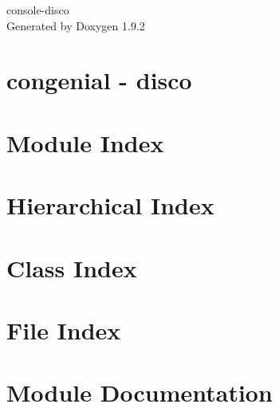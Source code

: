 \documentclass[twoside]{book}
\newcommand{\+}{\discretionary{\mbox{\scriptsize$\hookleftarrow$}}{}{}}
\newcommand{\clearemptydoublepage}{%
    \newpage{\pagestyle{empty}\cleardoublepage}%
  }
\begin{document}
  \raggedbottom
    \hypersetup{pageanchor=false,
                bookmarksnumbered=true,
                pdfencoding=unicode
               }
  \begin{titlepage}
  \vspace*{7cm}
  \begin{center}%
  {\Large console-\/disco}\\
  \vspace*{1cm}
  {\large Generated by Doxygen 1.9.2}\\
  \end{center}
  \end{titlepage}
  \clearemptydoublepage
  \tableofcontents
  \clearemptydoublepage
  \hypersetup{pageanchor=true}
\chapter{congenial -\/ disco}
\label{index}\hypertarget{index}{}
\chapter{Module Index}

\chapter{Hierarchical Index}

\chapter{Class Index}

\chapter{File Index}

\chapter{Module Documentation}






\end{document}
